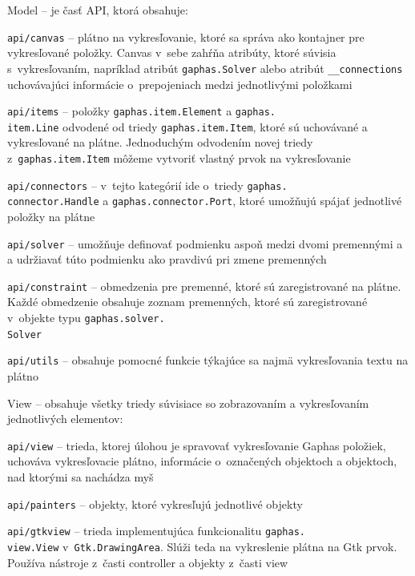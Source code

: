 \documentclass[11pt,oneside,final]{fithesis2}
\begin{document}
\begin{list}{•}{}

\item Model -- je časť API, ktorá obsahuje:

    \begin{list}{•}{}
    	\item \texttt{api/canvas} -- plátno na vykresľovanie, ktoré sa správa ako kontajner pre vykresľované položky. Canvas v~sebe zahŕňa atribúty, ktoré súvisia s~vykresľovaním, napríklad atribút \texttt{gaphas.Solver} alebo atribút \texttt{\_\_connections} uchovávajúci informácie o~prepojeniach medzi jednotlivými položkami
    	\item \texttt{api/items} -- položky \texttt{gaphas.item.Element} a \texttt{gaphas.\\item.Line} odvodené od triedy \texttt{gaphas.item.Item}, ktoré sú uchovávané a vykresľované na plátne.
    	Jednoduchým odvodením novej triedy z~\texttt{gaphas.item.Item} môžeme vytvoriť vlastný prvok na vykresľovanie
    	\item \texttt{api/connectors} -- v~tejto kategórií ide o~triedy \texttt{gaphas.\\connector.Handle} a \texttt{gaphas.connector.Port}, ktoré umožňujú spájať jednotlivé položky na plátne
    	\item \texttt{api/solver} -- umožňuje definovať podmienku aspoň medzi dvomi premennými a a udržiavať túto podmienku ako pravdivú pri zmene premenných
 		\item \texttt{api/constraint} -- obmedzenia pre premenné, ktoré sú zaregistrované na plátne. Každé obmedzenie obsahuje zoznam premenných, ktoré sú zaregistrované v~objekte typu \texttt{gaphas.solver.\\Solver}
 		\item \texttt{api/utils} -- obsahuje pomocné funkcie týkajúce sa najmä vykresľovania textu na plátno
    \end{list}


\item View -- obsahuje všetky triedy súvisiace so zobrazovaním a vykresľovaním jednotlivých elementov:
    \begin{list}{•}{}
    \item \texttt{api/view} -- trieda, ktorej úlohou je spravovať vykresľovanie Gaphas položiek, uchováva vykresľovacie plátno, informácie o~označených objektoch a objektoch, nad ktorými sa nachádza myš
    \item \texttt{api/painters} -- objekty, ktoré vykresľujú jednotlivé objekty
    \item \texttt{api/gtkview} -- trieda implementujúca funkcionalitu \texttt{gaphas.\\view.View} v~\texttt{Gtk.DrawingArea}. Slúži teda na vykreslenie plátna na Gtk prvok. Používa nástroje z~časti controller a objekty z~časti view
    \end{list}



\end{list}
\end{document}
